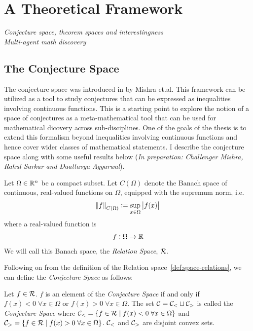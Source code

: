 \chapter{A Theoretical Framework}
\label{chap:theory-framework}
\textit{Conjecture space, theorem spaces and interestingness}\\
\textit{Multi-agent math discovery}

\section{The Conjecture Space}
\label{sec:conj-space}
The conjecture space was introduced in \cite{mishraConjGen2023} by Mishra et.al. This framework can be utilized as a tool to study conjectures that can be expressed as inequalities involving continuous functions. This is a starting point to explore the notion 
of a space of conjectures as a meta-mathematical tool that can be used for mathematical dicovery across sub-disciplines. One of the goals of the thesis is to extend this formalism beyond inequalities involving continuous functions and hence cover wider classes of mathematical statements. 
I describe the conjecture space along with some useful results below (\textit{In preparation: Challenger Mishra, Rahul Sarkar and Daattavya Aggarwal}).

\begin{definition}
    \label{def:space-relations}
    Let $\Omega\in\mathbb{R}^n$ be a compact subset. Let $C(\Omega)$ denote the Banach space of continuous, real-valued functions on $\Omega$, equipped with the supremum norm, i.e.
    \begin{equation*}
        \norm{f}_{C(\Omega)} := \sup_{x\in\Omega} \left|f(x)\right|    
    \end{equation*}
    where a real-valued function is
    \begin{equation*}
        f:\Omega\rightarrow\mathbb{R}
    \end{equation*}
    We will call this Banach space, the \textit{Relation Space}, $\mathcal{R}$.
\end{definition}

Following on from the definition of the Relation space~\ref{def:space-relations}, we can define the \textit{Conjecture Space} as follows:
\begin{definition}
    \label{def:conj-space}
    Let $f\in\mathcal{R}$. $f$ is an element of the \textit{Conjecture Space} if and only if $f(x) < 0 \;\forall x\in\Omega$ or $f(x) > 0 \; \forall x\in\Omega$.
    The set $\mathcal{C} = \mathcal{C}_{<}\sqcup\mathcal{C}_{>}$ is called the \textit{Conjecture Space} where $\mathcal{C}_{<} = \{f\in\mathcal{R}\;|\; f(x)<0\;\forall x\in\Omega\}$ and $\mathcal{C}_{>} = \{f\in\mathcal{R}\;|\;f(x)>0\;\forall x\in\Omega\}$.
    $\mathcal{C}_{<}$ and $\mathcal{C}_{>}$ are disjoint convex sets.
\end{definition}

